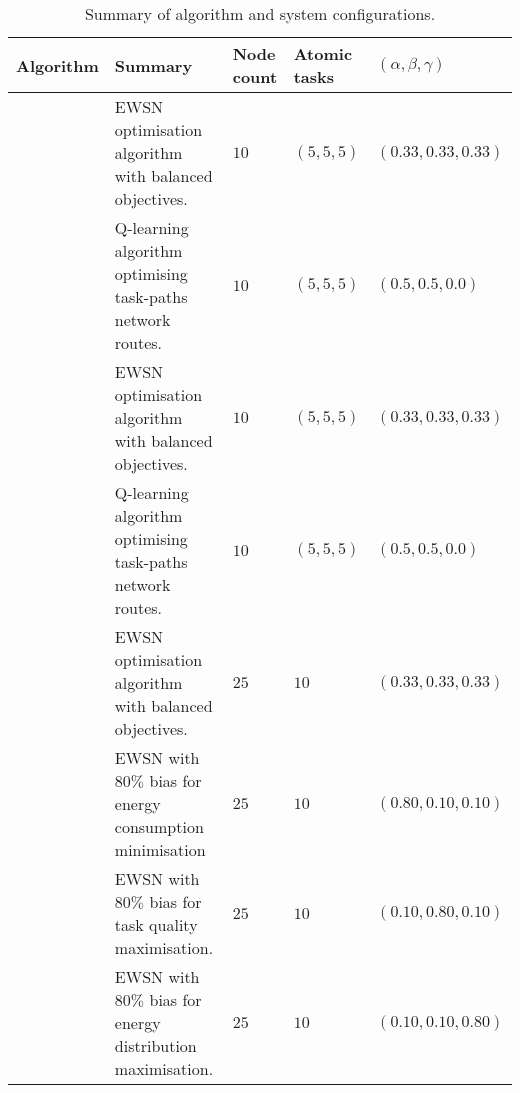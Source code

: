 
\begin{table}[h]
	\begin{tabular}
		{|p{}|p{}|p{}|p{}|p{}|}
		\hline
		\textbf{Algorithm} & \textbf{Summary} & \textbf{Node count} & \textbf{Atomic tasks}  & \textbf{$(\alpha,\beta,\gamma)$}\\
		\hline
		\algorithmBalancedSimple{}{} &  EWSN optimisation algorithm with balanced objectives. & $10$  & $(5,5,5)$   & $(0.33,0.33,0.33)$  \\
		\algorithmQRoutingSimple{}{} &  Q-learning algorithm optimising task-paths network routes.  & $10$  & $(5,5,5)$   & $(0.5,0.5,0.0)$  \\
		\algorithmFailure{}{} &  EWSN optimisation algorithm with balanced objectives. & $10$  & $(5,5,5)$   & $(0.33,0.33,0.33)$  \\
		\algorithmQRoutingFailure{}{} &  Q-learning algorithm optimising task-paths network routes.  & $10$  & $(5,5,5)$   & $(0.5,0.5,0.0)$  \\
		\algorithmBalancedExt{}{} &  EWSN optimisation algorithm with balanced objectives. & $25$ & $10$    & $(0.33,0.33,0.33)$  \\
		\algorithmEnergy{}{} & EWSN with $80\%$ bias for energy consumption minimisation  & $25$ & $10$   & $(0.80,0.10,0.10)$  \\
		\algorithmQuality{}{} & EWSN with $80\%$ bias for task quality maximisation. & $25$ & $10$   & $(0.10,0.80,0.10)$  \\
		\algorithmDistribution{}{} & EWSN with $80\%$ bias for energy distribution maximisation. & $25$ & $10$  & $(0.10,0.10,0.80)$  \\
		\hline
	\end{tabular}
	\captionsetup{labelfont=bf,singlelinecheck=on}
	\caption{Summary of algorithm and system configurations.}
	\label{table:summary_of_configurations}
\end{table}

